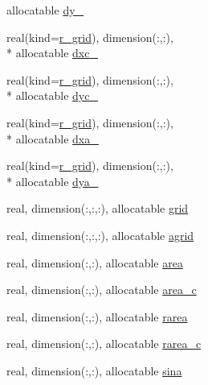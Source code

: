 \begin{DoxyCompactItemize}
allocatable \hyperlink{structfv__arrays__mod_1_1fv__grid__type_ac87c00324dc8d3118616eb5226951f34}{dy\-\_}
\item 
real(kind=\hyperlink{classfv__arrays__mod_ab0ba8527d270f349a84fa0a330be1923}{r\-\_\-grid}), dimension(\-:,\-:), \\*
allocatable \hyperlink{structfv__arrays__mod_1_1fv__grid__type_a028087387fc0acb7ca9afdb9ffd7deb0}{dxc\-\_}
\item 
real(kind=\hyperlink{classfv__arrays__mod_ab0ba8527d270f349a84fa0a330be1923}{r\-\_\-grid}), dimension(\-:,\-:), \\*
allocatable \hyperlink{structfv__arrays__mod_1_1fv__grid__type_a64e92f11a79556bfd02e38a249b0a918}{dyc\-\_}
\item 
real(kind=\hyperlink{classfv__arrays__mod_ab0ba8527d270f349a84fa0a330be1923}{r\-\_\-grid}), dimension(\-:,\-:), \\*
allocatable \hyperlink{structfv__arrays__mod_1_1fv__grid__type_a187343458f867c17bc045e4ed26f3dcf}{dxa\-\_}
\item 
real(kind=\hyperlink{classfv__arrays__mod_ab0ba8527d270f349a84fa0a330be1923}{r\-\_\-grid}), dimension(\-:,\-:), \\*
allocatable \hyperlink{structfv__arrays__mod_1_1fv__grid__type_a1e026e325f52a9278c2f871a5d9c1c31}{dya\-\_}
\item 
real, dimension(\-:,\-:,\-:), allocatable \hyperlink{structfv__arrays__mod_1_1fv__grid__type_ab4f3c37b71e4dd444556536138e886d5}{grid}
\item 
real, dimension(\-:,\-:,\-:), allocatable \hyperlink{structfv__arrays__mod_1_1fv__grid__type_ae68d27d082cbf8e50fd21e72ff2f4794}{agrid}
\item 
real, dimension(\-:,\-:), allocatable \hyperlink{structfv__arrays__mod_1_1fv__grid__type_a0f623e116b083899ab4cb87775cb9d42}{area}
\item 
real, dimension(\-:,\-:), allocatable \hyperlink{structfv__arrays__mod_1_1fv__grid__type_a3ca9fa6025d14276c65dfbb0cfb579dd}{area\-\_\-c}
\item 
real, dimension(\-:,\-:), allocatable \hyperlink{structfv__arrays__mod_1_1fv__grid__type_a436b669aa9d18827e6588b30cbe861bd}{rarea}
\item 
real, dimension(\-:,\-:), allocatable \hyperlink{structfv__arrays__mod_1_1fv__grid__type_a5be0a23653758af18d87f2bde5c07fcf}{rarea\-\_\-c}
\item 
real, dimension(\-:,\-:), allocatable \hyperlink{structfv__arrays__mod_1_1fv__grid__type_a5b1f29fb1d464639f2622e750b649701}{sina}

\end{DoxyCompactItemize}
